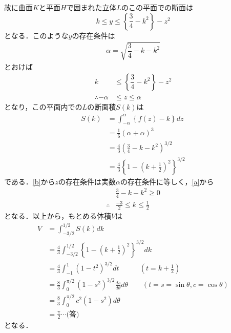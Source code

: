 \documentclass[a4j]{jarticle}
\begin{document}
\begin{multicols}{2}
故に曲面$K$と平面$H$で囲まれた立体$L$のこの平面での断面は
     \[ k\le y\le \left\{ \dfrac{3}{4}-k^2\right\}-z^2 \]
となる．このような$y$の存在条件は
     \begin{align}
     \alpha=\sqrt{\dfrac{3}{4}-k-k^2} \label{a}
     \end{align}
とおけば
     \begin{align}
     k&\le \left\{ \dfrac{3}{4}-k^2\right\}-z^2 \nonumber\\
     \therefore -\alpha&\le z\le \alpha \label{b}
     \end{align}
となり，この平面内での$L$の断面積$S(k)$は
     \begin{align*}
     S(k)&=\int_{-\alpha}^\alpha \left\{ f(z)-k\right\}dz \\
     &=\frac{1}{6}(\alpha+\alpha)^3 \\
     &=\frac{4}{3}\left(\frac{3}{4}-k-k^2\right)^{3/2} \\
     &=\frac{4}{3}\left\{1-\left(k+\frac{1}{2}\right)^2\right\}^{3/2}
     \end{align*}
である．\eqref{b}から$z$の存在条件は実数$\alpha$の存在条件に等しく，\eqref{a}から
     \begin{align*}
     &\frac{3}{4}-k-k^2\ge0 \\
     \therefore&\frac{-3}{2}\le k \le\frac{1}{2}
     \end{align*}
となる．以上から，もとめる体積$V$は
     \begin{align*}
     V&=\int_{-3/2}^{1/2}S(k)dk \\
     &=\frac{4}{3}\int_{-3/2}^{1/2}\left\{1-\left(k+\frac{1}{2}\right)^2\right\}^{3/2}dk \\
     &=\frac{4}{3}\int_{-1}^{1}\left(1-t^2\right)^{3/2}dt \ \ \ \ \ \ \ \ \ \ \ \ \ (t=k+\frac{1}{2}) \\
     &=\frac{8}{3}\int_0^{\pi/2}\left(1-s^2\right)^{3/2}\frac{ds}{d\theta}d\theta \ \ \ \ \ \ \ \ \ (t=s=\sin\theta%
     ,c=\cos\theta) \\
     &=\frac{8}{3}\int_0^{\pi/2}c^2(1-s^2)d\theta \\
     &=\frac{\pi}{2}\cdots\text{(答)}
     \end{align*}
となる．
\vspace{2zh}


\end{multicols}
\end{document}
